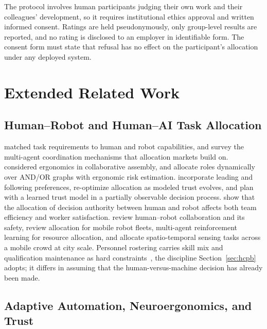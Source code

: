 \documentclass[utf8]{frontiers_suppmat}
\begin{document}
The protocol involves human participants judging their own work and their colleagues' development, so it requires institutional ethics approval and written informed consent. Ratings are held pseudonymously, only group-level results are reported, and no rating is disclosed to an employer in identifiable form. The consent form must state that refusal has no effect on the participant's allocation under any deployed system.

\section{Extended Related Work}
\label{app:rw}

\subsection{Human--Robot and Human--AI Task Allocation}
\label{app:rw-hrta}

\citet{Ranz2017} matched task requirements to human and robot capabilities, and \citet{Dorri2018} survey the multi-agent coordination mechanisms that allocation markets build on. \citet{Makrini2019} considered ergonomics in collaborative assembly, and \citet{Merlo2023} allocate roles dynamically over AND/OR graphs with ergonomic risk estimation. \citet{Noormohammadi2025} incorporate leading and following preferences, \citet{Ali2022} re-optimize allocation as modeled trust evolves, and \citet{Chen2018} plan with a learned trust model in a partially observable decision process. \citet{Gombolay2015} show that the allocation of decision authority between human and robot affects both team efficiency and worker satisfaction. \citet{Ajoudani2018} review human--robot collaboration and \citet{Lasota2017} its safety, \citet{MeseguerValenzuela2025} review allocation for mobile robot fleets, \citet{Hady2025} multi-agent reinforcement learning for resource allocation, and \citet{Zhao2023} allocate spatio-temporal sensing tasks across a mobile crowd at city scale. Personnel rostering carries skill mix and qualification maintenance as hard constraints~\citep{Burke2004,VandenBergh2013}, the discipline Section~\ref{sec:hcpb} adopts; it differs in assuming that the human-versus-machine decision has already been made.

\subsection{Adaptive Automation, Neuroergonomics, and Trust}
\label{app:rw-adaptive}
\end{document}
